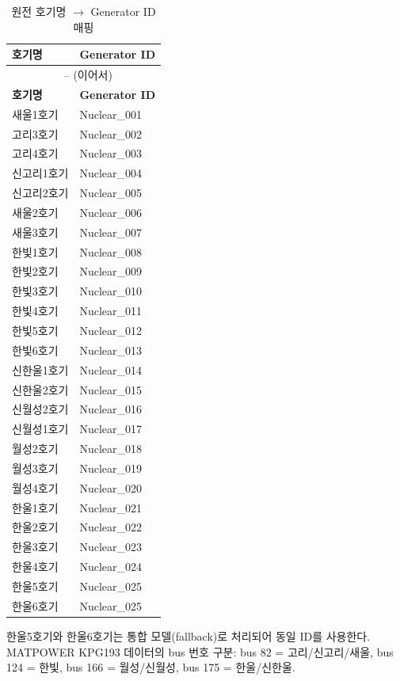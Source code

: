 \documentclass[11pt, a4paper]{article}
\begin{document}
\begin{longtable}{ll}
\caption{원전 호기명 $\to$ Generator ID 매핑}\label{tab:nuclear_map} \\
\toprule
\textbf{호기명} & \textbf{Generator ID} \\
\midrule
\endfirsthead
\multicolumn{2}{c}{\tablename\ \thetable{} -- (이어서)} \\
\toprule
\textbf{호기명} & \textbf{Generator ID} \\
\midrule
\endhead
\bottomrule
\endfoot
새울1호기   & Nuclear\_001 \\
고리3호기   & Nuclear\_002 \\
고리4호기   & Nuclear\_003 \\
신고리1호기 & Nuclear\_004 \\
신고리2호기 & Nuclear\_005 \\
새울2호기   & Nuclear\_006 \\
새울3호기   & Nuclear\_007 \\
한빛1호기   & Nuclear\_008 \\
한빛2호기   & Nuclear\_009 \\
한빛3호기   & Nuclear\_010 \\
한빛4호기   & Nuclear\_011 \\
한빛5호기   & Nuclear\_012 \\
한빛6호기   & Nuclear\_013 \\
신한울1호기 & Nuclear\_014 \\
신한울2호기 & Nuclear\_015 \\
신월성2호기 & Nuclear\_016 \\
신월성1호기 & Nuclear\_017 \\
월성2호기   & Nuclear\_018 \\
월성3호기   & Nuclear\_019 \\
월성4호기   & Nuclear\_020 \\
한울1호기   & Nuclear\_021 \\
한울2호기   & Nuclear\_022 \\
한울3호기   & Nuclear\_023 \\
한울4호기   & Nuclear\_024 \\
한울5호기   & Nuclear\_025 \\
한울6호기   & Nuclear\_025 \\
\end{longtable}

\noindent 한울5호기와 한울6호기는 통합 모델(fallback)로 처리되어 동일 ID를 사용한다.
MATPOWER KPG193 데이터의 bus 번호 구분:
bus 82 = 고리/신고리/새울, bus 124 = 한빛,
bus 166 = 월성/신월성, bus 175 = 한울/신한울.
\end{document}
